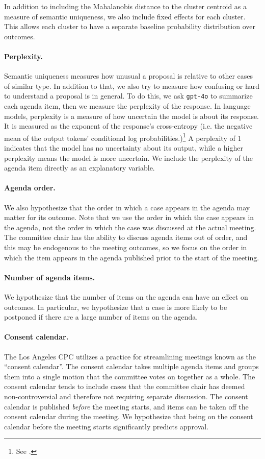 In addition to including the Mahalanobis distance to the cluster centroid as a measure of semantic uniqueness, we also include fixed effects for each cluster. This allows each cluster to have a separate baseline probability distribution over outcomes.

\paragraph{Perplexity.} Semantic uniqueness measures how unusual a proposal is relative to other cases of similar type. In addition to that, we also try to measure how confusing or hard to understand a proposal is in general. To do this, we ask \texttt{gpt-4o} to summarize each agenda item, then we measure the perplexity of the response. In language models, perplexity is a measure of how uncertain the model is about its response. It is measured as the exponent of the response's cross-entropy  (i.e. the negative mean of the output tokens' conditional log probabilities.)\footnote{See \citet{jm2}.} A perplexity of 1 indicates that the model has no uncertainty about its output, while a higher perplexity means the model is more uncertain. We include the perplexity of the agenda item directly as an explanatory variable.

\paragraph{Agenda order.} We also hypothesize that the order in which a case appears in the agenda may matter for its outcome. Note that we use the order in which the case appears in the agenda, not the order in which the case was discussed at the actual meeting. The committee chair has the ability to discuss agenda items out of order, and this may be endogenous to the meeting outcomes, so we focus on the order in which the item appears in the agenda published prior to the start of the meeting.

\paragraph{Number of agenda items.} We hypothesize that the number of items on the agenda can have an effect on outcomes. In particular, we hypothesize that a case is more likely to be postponed if there are a large number of items on the agenda.

\paragraph{Consent calendar.} The Los Angeles CPC utilizes a practice for streamlining meetings known as the ``consent calendar''. The consent calendar takes multiple agenda items and groups them into a single motion that the committee votes on together as a whole. The consent calendar tends to include cases that the committee chair has deemed non-controversial and therefore not requiring separate discussion. The consent calendar is published \emph{before} the meeting starts, and items can be taken off the consent calendar during the meeting. We hypothesize that being on the consent calendar before the meeting starts significantly predicts approval.

